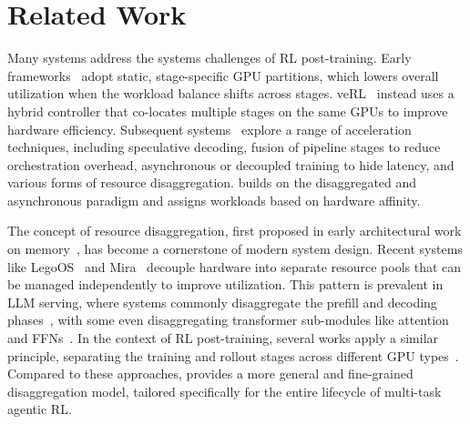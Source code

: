 \section{Related Work}
\label{sec:related_works}


Many systems address the systems challenges of RL post-training. Early frameworks~\cite{Harper_NeMo_a_toolkit,deepspeedchat,hu2024openrlhf} adopt static, stage-specific GPU partitions, which lowers overall utilization when the workload balance shifts across stages. veRL~\cite{verl} instead uses a hybrid controller that co-locates multiple stages on the same GPUs to improve hardware efficiency. Subsequent systems~\cite{liu2025specrlacceleratingonpolicyreinforcement,chen2025respecoptimizingspeculativedecoding,cheng2025fastllmposttrainingdecoupled,shao2025beatlongtaildistributionaware,RhymeRL,zhong2024rlhfuseefficientrlhftraining,areal,asyncflow,Laminar,StreamRL} explore a range of acceleration techniques, including speculative decoding, fusion of pipeline stages to reduce orchestration overhead, asynchronous or decoupled training to hide latency, and various forms of resource disaggregation. \SystemName{} builds on the disaggregated and asynchronous paradigm and assigns workloads based on hardware affinity.



 The concept of resource disaggregation, first proposed in early architectural work on memory~\cite{disaggregated-mem-isca09}, has become a cornerstone of modern system design. Recent systems like LegoOS~\cite{shan2018legoos} and Mira~\cite{guo2023mira} decouple hardware into separate resource pools that can be managed independently to improve utilization. This pattern is prevalent in LLM serving, where systems commonly disaggregate the prefill and decoding phases~\cite{distserve, patel2023splitwise, hu2024inference, strati2024dejavu, qin2024mooncake}, with some even disaggregating transformer sub-modules like attention and FFNs~\cite{megascale-infer,step3}. In the context of RL post-training, several works apply a similar principle, separating the training and rollout stages across different GPU types~\cite{StreamRL,seamlessflow}. Compared to these approaches, \SystemName{} provides a more general and fine-grained disaggregation model, tailored specifically for the entire lifecycle of multi-task agentic RL. 


